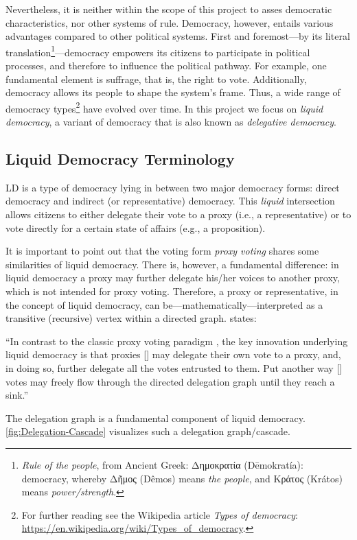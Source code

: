 Nevertheless, it is neither within the scope of this project to asses democratic characteristics, nor other systems of rule. Democracy, however, entails various advantages compared to other political systems. First and foremost---by its literal translation\footnote{\textit{Rule of the people}, from Ancient Greek: \textgreek{Δημοκρατία} (Dēmokratía): democracy, whereby \textgreek{Δῆμος} (Dêmos) means \textit{the people}, and \textgreek{Κράτος} (Krátos) means \textit{power/strength}.}---democracy empowers its citizens to participate in political processes, and therefore to influence the political pathway. For example, one fundamental element is suffrage, that is, the right to vote. Additionally, democracy allows its people to shape the system’s frame. Thus, a wide range of democracy types\footnote{For further reading see the Wikipedia article \textit{Types of democracy}: \url{https://en.wikipedia.org/wiki/Types_of_democracy}.} have evolved over time. In this project we focus on \textit{liquid democracy}, a variant of democracy that is also known as \textit{delegative democracy}.


\subsection{Liquid Democracy Terminology}
\label{ssec:Liquid_Democracy}

\acrfull{LD} is a type of democracy lying in between two major democracy forms: direct democracy and indirect (or representative) democracy. This \textit{liquid} intersection allows citizens to either delegate their vote to a proxy (i.e., a representative) or to vote directly for a certain state of affairs (e.g., a proposition).

It is important to point out that the voting form \textit{proxy voting} shares some similarities of liquid democracy. There is, however, a fundamental difference: in liquid democracy a proxy may further delegate his/her voices to another proxy, which is not intended for proxy voting. Therefore, a proxy or representative, in the concept of liquid democracy, can be---mathematically---interpreted as a transitive (recursive) vertex within a directed graph. \citeauthor{Kahng2018} states:

\begin{displayquote}
“In contrast to the classic proxy voting paradigm \parencite{Miller1969}, the key innovation underlying liquid democracy is that proxies [\textellipsis] may delegate their own vote to a proxy, and, in doing so, further delegate all the votes entrusted to them. Put another way [\textellipsis] votes may freely flow through the directed delegation graph until they reach a sink.”\\[1mm]
\hspace*{\fill}\textcite{Kahng2018}
\end{displayquote}
The delegation graph is a fundamental component of liquid democracy. \autoref{fig:Delegation-Cascade} visualizes such a delegation graph/cascade. 

